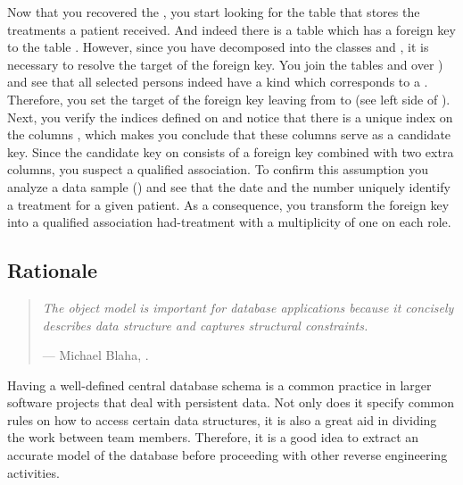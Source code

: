 \documentclass[a4paper,10pt,twoside]{book}
\begin{document}
Now that you recovered the , you start looking for the table that stores the 
treatments a patient received. And indeed there is a table  which has a 
foreign key to the table . However, since you have decomposed  into 
the classes  and , it is necessary to resolve the target of the 
foreign key. You join the tables  and  over ) 
and see that all selected persons indeed have a kind which corresponds to a . 
Therefore, you set the target of the foreign key leaving from  to 
 (see left side of ). Next, you verify the 
indices defined on  and notice that there is a unique index on the columns 
, which makes you conclude that these columns serve as a 
candidate key. Since the candidate key on  consists of a foreign key 
combined with two extra columns, you suspect a qualified association. To confirm this 
assumption you analyze a data sample () and see that the date and 
the number uniquely identify a treatment for a given patient. As a consequence, you 
transform the foreign key into a qualified association had-treatment with a multiplicity of 
one on each role.

\subsection*{Rationale}

\begin{quotation}
\noindent
\emph{The object model is important for database applications because it concisely describes data structure and captures structural constraints.}

\hfill --- Michael Blaha, \etal. \cite{Blah98a} 
\end{quotation}

Having a well-defined central database schema is a common practice in larger software 
projects that deal with persistent data. Not only does it specify common rules on how to 
access certain data structures, it is also a great aid in dividing the work between team 
members. Therefore, it is a good idea to extract an accurate model of the database before 
proceeding with other reverse engineering activities.
\end{document}
